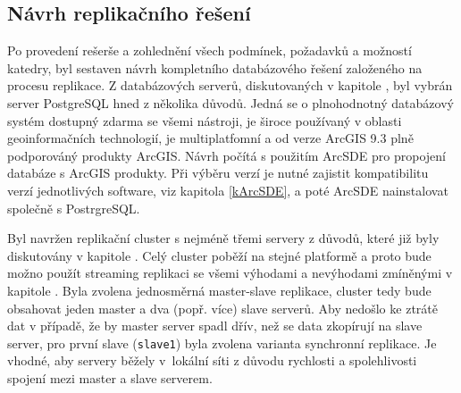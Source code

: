 \subsection[Návrh replikačního řešení]{Návrh replikačního řešení}
      \label{kNavrh}

      Po provedení rešerše a zohlednění všech podmínek, požadavků a možností katedry, byl sestaven návrh kompletního databázového řešení založeného na procesu replikace. Z databázových serverů, diskutovaných v kapitole , byl vybrán server PostgreSQL hned z několika důvodů. Jedná se o plnohodnotný databázový systém dostupný zdarma se všemi nástroji, je široce používaný v oblasti geoinformačních technologií, je multiplatfomní a od verze ArcGIS 9.3 plně podporováný produkty ArcGIS. Návrh počítá s použitím ArcSDE pro propojení databáze s ArcGIS produkty. Při výběru verzí je nutné zajistit kompatibilitu verzí jednotlivých software, viz kapitola \ref{kArcSDE}, a poté ArcSDE nainstalovat společně s PostrgreSQL.

      Byl navržen replikační cluster s nejméně třemi servery z důvodů, které již byly diskutovány v kapitole . Celý cluster poběží na stejné platformě a proto bude možno použít streaming replikaci se všemi výhodami a nevýhodami zmíněnými v kapitole . Byla zvolena jednosměrná master-slave replikace, cluster tedy bude obsahovat jeden master a dva (popř. více) slave serverů. Aby nedošlo ke ztrátě dat v případě, že by master server spadl dřív, než se data zkopírují na slave server, pro první slave (\texttt{slave1}) byla zvolena varianta synchronní replikace. Je vhodné, aby servery běžely v~lokální síti z důvodu rychlosti a spolehlivosti spojení mezi master a slave serverem. 


